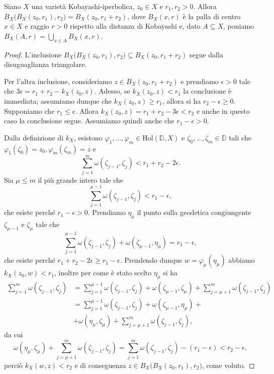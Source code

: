 \begin{lm} \label{ballball}
    Siano $X$ una varietà Kobayashi-iperbolica, $z_0 \in X$ e $r_1,r_2>0$. Allora $B_X\big(B_X(z_0,r_1),r_2\big)=B_X(z_0,r_1+r_2)$, dove $B_X(x,r)$ è la palla di centro $x \in X$ e raggio $r>0$ rispetto alla distanza di Kobayashi e, dato $A\subseteq X$, poniamo $B_X(A,r)=\displaystyle\bigcup_{x \in A}B_X(x,r)$.
\end{lm}
\begin{proof}
    L'inclusione $B_X\big(B_X(z_0,r_1),r_2\big)\subseteq B_X(z_0,r_1+r_2)$ segue dalla disuguaglianza triangolare.

    Per l'altra inclusione, consideriamo $z \in B_X(z_0,r_1+r_2)$ e prendiamo $\epsilon>0$ tale che $3\epsilon=r_1+r_2-k_X(z_0,z)$. Adesso, se $k_X(z_0,z)<r_1$ la conclusione è immediata; assumiamo dunque che $k_X(z_0,z)\ge r_1$, allora si ha $r_2-\epsilon \ge 0$. Supponiamo che $r_1 \le \epsilon$. Allora $k_X(z_0,z)=r_1+r_2-3\epsilon<r_2$ e anche in questo caso la conclusione segue. Assumiamo quindi anche che $r_1-\epsilon>0$.

    Dalla definizione di $k_X$, esistono $\varphi_1,\dots,\varphi_m \in \text{Hol}(\mathbb{D},X)$ e $\zeta_0,\dots,\zeta_m \in \mathbb{D}$ tali che $\varphi_1(\zeta_0)=z_0, \varphi_m(\zeta_m)=z$ e
    $$\sum_{j=1}^m \omega(\zeta_{j-1},\zeta_j)<r_1+r_2-2\epsilon.$$
    Sia $\mu \le m$ il più grande intero tale che
    $$\sum_{j=1}^{\mu-1} \omega(\zeta_{j-1},\zeta_j)<r_1-\epsilon,$$
    che esiste perché $r_1-\epsilon>0$. Prendiamo $\eta_{\mu}$ il punto sulla geodetica congiungente $\zeta_{\mu-1}$ e $\zeta_{\mu}$ tale che
    $$\sum_{j=1}^{\mu-1} \omega(\zeta_{j-1},\zeta_j)+\omega(\zeta_{\mu-1},\eta_{\mu})=r_1-\epsilon,$$
    che esiste perché $r_1+r_2-2\epsilon \ge r_1-\epsilon$. Prendendo dunque $w=\varphi_{\mu}(\eta_{\mu})$ abbiamo $k_X(z_0,w)<r_1$, inoltre per come è stato scelto $\eta_{\mu}$ si ha
    \begin{align*}
        \sum_{j=1}^m \omega(\zeta_{j-1},\zeta_j)&=\sum_{j=1}^{\mu-1} \omega(\zeta_{j-1},\zeta_j)+\omega(\zeta_{\mu-1},\zeta_{\mu})+\sum_{j=\mu+1}^m \omega(\zeta_{j-1},\zeta_j)\\
        &=\sum_{j=1}^{\mu-1} \omega(\zeta_{j-1},\zeta_j)+\omega(\zeta_{\mu-1},\eta_{\mu})+\\
        &+\omega(\eta_{\mu},\zeta_{\mu})+\sum_{j=\mu+1}^m \omega(\zeta_{j-1},\zeta_j),
    \end{align*}
    da cui
    $$\omega(\eta_{\mu},\zeta_{\mu})+\sum_{j=\mu+1}^m \omega(\zeta_{j-1},\zeta_j)=\sum_{j=1}^m \omega(\zeta_{j-1},\zeta_j)-(r_1-\epsilon)<r_2-\epsilon,$$
    perciò $k_X(w,z)<r_2$ e di conseguenza $z \in B_X\big(B_X(z_0,r_1),r_2\big)$, come voluto.
\end{proof}

